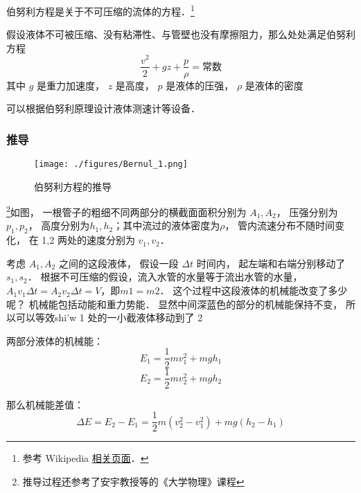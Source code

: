 

伯努利方程是关于不可压缩的流体的方程．\footnote{参考 Wikipedia \href{https://en.wikipedia.org/wiki/Bernoulli-principle}{相关页面}．}

假设液体不可被压缩、没有粘滞性、与管壁也没有摩擦阻力，那么处处满足伯努利方程
\begin{equation}
\frac{v^2}{2} + gz + \frac{p}{\rho} = \text{常数}
\end{equation}
其中 $g$ 是重力加速度， $z$ 是高度， $p$ 是液体的压强， $\rho$ 是液体的密度

可以根据伯努利原理设计液体测速计等设备．

\subsubsection{推导}

\begin{figure}[ht]
\centering
\texttt{[image: ./figures/Bernul\_1.png]}
\caption{伯努利方程的推导}\label{Bernul_fig1}
\end{figure}
\footnote{推导过程还参考了安宇教授等的《大学物理》课程}如图， 一根管子的粗细不同两部分的横截面面积分别为 $A_1, A_2$， 压强分别为 $p_1, p_2$， 高度分别为$h_1, h_2$；其中流过的液体密度为$\rho$， 管内流速分布不随时间变化， 在  1,2 两处的速度分别为 $v_1, v_2$．

考虑 $A_1, A_2$ 之间的这段液体， 假设一段 $\Delta t$ 时间内， 起左端和右端分别移动了 $s_1, s_2$．
根据不可压缩的假设，流入水管的水量等于流出水管的水量，$A_1v_1\Delta t=A_2v_2\Delta t=V$，即$m1=m2$． 这个过程中这段液体的机械能改变了多少呢？ 机械能包括动能和重力势能． 显然中间深蓝色的部分的机械能保持不变， 所以可以等效shi'w 1 处的一小截液体移动到了 2 

两部分液体的机械能：
\begin{equation}
E_1=\frac{1}{2}mv_1^2+mgh_1
\end{equation}
\begin{equation}
E_2=\frac{1}{2}mv_2^2+mgh_2
\end{equation}

那么机械能差值：
\begin{equation}
\Delta E = E_2 - E_1 = \frac{1}{2}m(v_2^2-v_1^2)+mg(h_2-h_1)
\end{equation}

